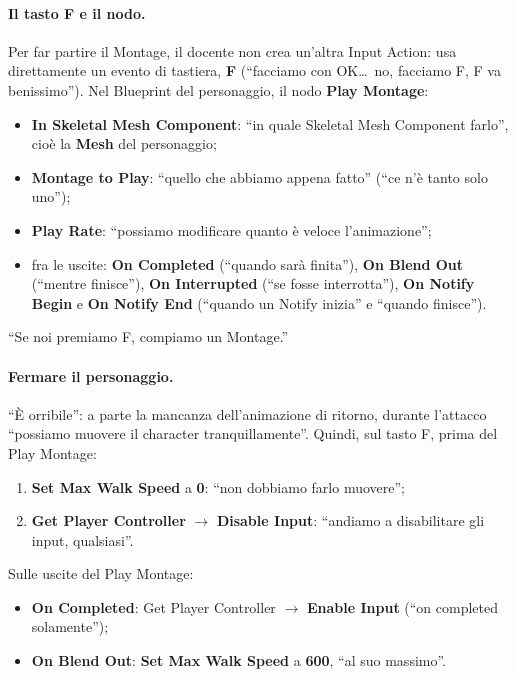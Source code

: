 \paragraph{Il tasto F e il nodo.} Per far partire il Montage, il docente non crea
un'altra Input Action: usa direttamente un evento di tastiera, \textbf{F} (``facciamo con
OK\dots\ no, facciamo F, F va benissimo''). Nel Blueprint del personaggio, il nodo
\textbf{Play Montage}:
\begin{itemize}
  \item \textbf{In Skeletal Mesh Component}: ``in quale Skeletal Mesh Component
        farlo'', cioè la \textbf{Mesh} del personaggio;
  \item \textbf{Montage to Play}: ``quello che abbiamo appena fatto'' (``ce n'è tanto solo
        uno'');
  \item \textbf{Play Rate}: ``possiamo modificare quanto è veloce l'animazione'';
  \item fra le uscite: \textbf{On Completed} (``quando sarà finita''), \textbf{On Blend
        Out} (``mentre finisce''), \textbf{On Interrupted} (``se fosse interrotta''),
        \textbf{On Notify Begin} e \textbf{On Notify End} (``quando un Notify inizia'' e
        ``quando finisce'').
\end{itemize}
``Se noi premiamo F, compiamo un Montage.''

\paragraph{Fermare il personaggio.} ``È orribile'': a parte la mancanza dell'animazione di
ritorno, durante l'attacco ``possiamo muovere il character tranquillamente''. Quindi, sul
tasto F, prima del Play Montage:
\begin{enumerate}
  \item \textbf{Set Max Walk Speed} a \textbf{0}: ``non dobbiamo farlo muovere'';
  \item \textbf{Get Player Controller} $\rightarrow$ \textbf{Disable Input}: ``andiamo a
        disabilitare gli input, qualsiasi''.
\end{enumerate}
Sulle uscite del Play Montage:
\begin{itemize}
  \item \textbf{On Completed}: Get Player Controller $\rightarrow$ \textbf{Enable Input}
        (``on completed solamente'');
  \item \textbf{On Blend Out}: \textbf{Set Max Walk Speed} a \textbf{600}, ``al suo
        massimo''.
\end{itemize}

